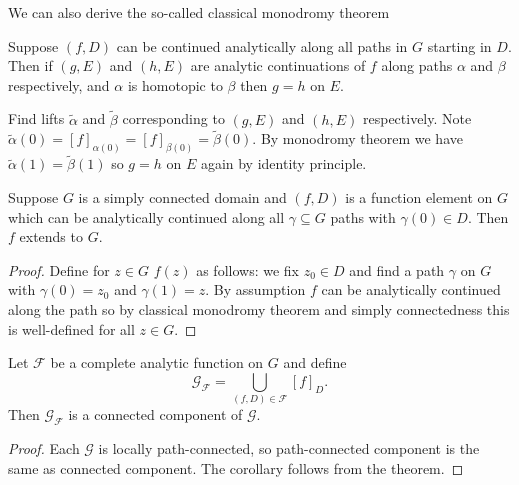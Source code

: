 \documentclass[a4paper]{article}
\begin{document}
We can also derive the so-called classical monodromy theorem

\begin{theorem}
  Suppose \((f, D)\) can be continued analytically along all paths in \(G\) starting in \(D\). Then if \((g, E)\) and \((h, E)\) are analytic continuations of \(f\) along paths \(\alpha\) and \(\beta\) respectively, and \(\alpha\) is homotopic to \(\beta\) then \(g = h\) on \(E\).
\end{theorem}

\begin{theorem}
  Find lifts \(\tilde \alpha\) and \(\tilde \beta\) corresponding to \((g, E)\) and \((h, E)\) respectively. Note \(\tilde \alpha(0) = [f]_{\alpha(0)} = [f]_{\beta(0)} = \tilde \beta(0)\). By monodromy theorem we have \(\tilde \alpha(1) = \tilde \beta(1)\) so \(g = h\) on \(E\) again by identity principle.
\end{theorem}

\begin{corollary}
  Suppose \(G\) is a simply connected domain and \((f, D)\) is a function element on \(G\) which can be analytically continued along all \(\gamma \subseteq G\) paths with \(\gamma(0) \in D\). Then \(f\) extends to \(G\).
\end{corollary}

\begin{proof}
  Define for \(z \in G\) \(f(z)\) as follows: we fix \(z_0 \in D\) and find a path \(\gamma\) on \(G\) with \(\gamma(0) = z_0\) and \(\gamma(1) = z\). By assumption \(f\) can be analytically continued along the path so by classical monodromy theorem and simply connectedness this is well-defined for all \(z \in G\).
\end{proof}





\begin{corollary}
  Let \(\mathcal F\) be a complete analytic function on \(G\) and define
  \[
    \mathcal G_{\mathcal F} = \bigcup_{(f, D) \in \mathcal F} [f]_D.
  \]
  Then \(\mathcal G_{\mathcal F}\) is a connected component of \(\mathcal G\).
\end{corollary}

\begin{proof}
  Each \(\mathcal G\) is locally path-connected, so path-connected component is the same as connected component. The corollary follows from the theorem.
\end{proof}
\end{document}
